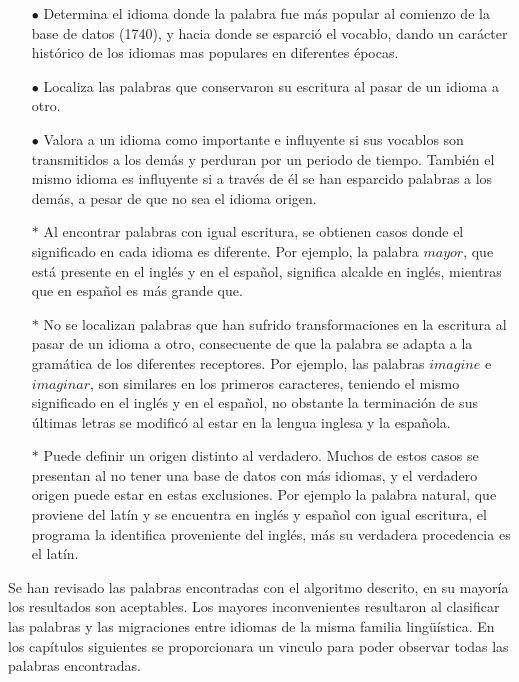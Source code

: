 \begin{itemize}
\item [$\bullet$] 
Determina el idioma donde la palabra fue más popular al comienzo de
la base de datos (1740), y hacia donde se esparció el vocablo, dando un
carácter histórico de los idiomas mas populares en diferentes épocas. 

\item [$\bullet$] 
Localiza las palabras que conservaron su escritura al pasar de un
idioma a otro. 

\item [$\bullet$] 
Valora a un idioma como importante e influyente si sus vocablos son
transmitidos a los demás y perduran por un periodo de tiempo. También el mismo
idioma es influyente si a través de él se han esparcido palabras a los demás, a
pesar de que no sea el idioma origen. 

\item [$\ast$] Al encontrar palabras con igual escritura, se obtienen casos donde
el significado en cada idioma es diferente.  Por ejemplo, la palabra
$\textit{mayor}$, que está presente en el inglés y en el español,  significa
alcalde en inglés, mientras que en español es más grande que.

\item [$\ast$]
No se localizan palabras que han sufrido transformaciones en la
escritura al pasar de un idioma a otro, consecuente de que la palabra se adapta
a la gramática de los diferentes receptores.  Por ejemplo, las palabras
$\textit{imagine}$ e $\textit{imaginar}$, son similares en los primeros
caracteres, teniendo el mismo significado en el inglés y en el español, no
obstante la terminación de  sus últimas letras se modificó al estar en  la
lengua inglesa y la española. 

\item [$\ast$]
 Puede definir un origen distinto al verdadero.  Muchos de estos casos se
presentan al no tener una base de datos con más idiomas, y el verdadero origen
puede estar en estas exclusiones. Por ejemplo la palabra natural, que proviene
del latín y se encuentra en inglés y español con igual escritura,  el programa
la identifica proveniente del inglés, más su verdadera procedencia es el latín. 

\end{itemize}

Se han revisado las palabras encontradas con el algoritmo descrito, en su
mayoría los resultados son aceptables. Los mayores inconvenientes resultaron al
clasificar las palabras y las migraciones entre idiomas de la misma familia
lingüística.  En los capítulos siguientes se proporcionara un vinculo para
poder observar todas las palabras encontradas. 


